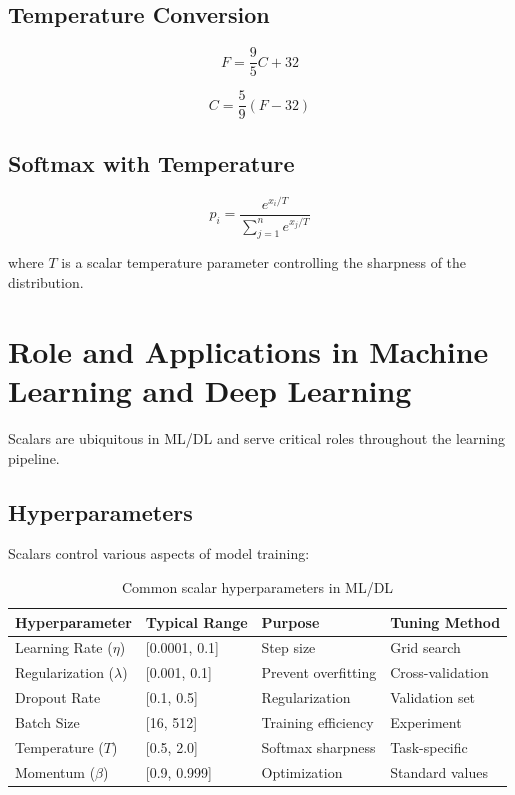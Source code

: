 \documentclass[11pt,a4paper]{article}
\begin{document}
\subsection{Temperature Conversion}

\begin{equation}
    F = \frac{9}{5}C + 32
\end{equation}

\begin{equation}
    C = \frac{5}{9}(F - 32)
\end{equation}

\subsection{Softmax with Temperature}

\begin{equation}
    p_i = \frac{e^{x_i/T}}{\sum_{j=1}^{n} e^{x_j/T}}
\end{equation}

where $T$ is a scalar temperature parameter controlling the sharpness of the distribution.

\section{Role and Applications in Machine Learning and Deep Learning}

Scalars are ubiquitous in ML/DL and serve critical roles throughout the learning pipeline.

\subsection{Hyperparameters}

Scalars control various aspects of model training:

\begin{table}[h]
\centering
\small
\begin{tabular}{|l|l|l|l|}
\hline
\textbf{Hyperparameter} & \textbf{Typical Range} & \textbf{Purpose} & \textbf{Tuning Method} \\ \hline
Learning Rate ($\eta$) & [0.0001, 0.1] & Step size & Grid search \\ \hline
Regularization ($\lambda$) & [0.001, 0.1] & Prevent overfitting & Cross-validation \\ \hline
Dropout Rate & [0.1, 0.5] & Regularization & Validation set \\ \hline
Batch Size & [16, 512] & Training efficiency & Experiment \\ \hline
Temperature ($T$) & [0.5, 2.0] & Softmax sharpness & Task-specific \\ \hline
Momentum ($\beta$) & [0.9, 0.999] & Optimization & Standard values \\ \hline
\end{tabular}
\caption{Common scalar hyperparameters in ML/DL}
\end{table}
\end{document}
